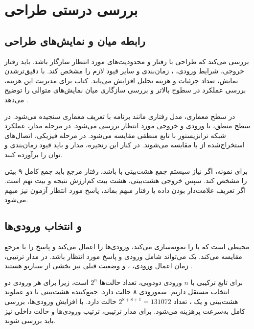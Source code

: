 \section{بررسی درستی طراحی}
\label{sec:book-verification}
\subsection{رابطه میان  و نمایش‌های طراحی}
 بررسی می‌کند که طراحی با رفتار و محدودیت‌های مورد انتظار
سازگار باشد.  باید رفتار خروجی، شرایط ورودی، ،
زمان‌بندی و سایر قیود لازم را مشخص کند. با دقیق‌ترشدن نمایش، تعداد جزئیات و هزینه
تحلیل افزایش می‌یابد. کتاب برای مدیریت این هزینه، بررسی عملکرد در سطوح بالاتر و
بررسی سازگاری میان نمایش‌های متوالی را توضیح می‌دهد
\cite[بخش ، شکل ]{weste}.

در سطح معماری، مدل رفتاری مانند برنامه  با تعریف معماری سنجیده می‌شود.
در سطح منطق،  با ورودی و خروجی مورد انتظار بررسی می‌شود. در مرحله مدار،
عملکرد شبکه ترانزیستور با تابع منطقی مقایسه می‌شود. در مرحله فیزیکی، اتصال‌های
استخراج‌شده از  با  مقایسه می‌شوند. در کنار این زنجیره،
مدار و  باید قیود زمان‌بندی و توان را برآورده کنند.

برای نمونه، اگر نیاز سیستم جمع هشت‌بیتی با  باشد، رفتار مرجع باید
جمع کامل ۹ بیتی را مشخص کند. سپس خروجی هشت‌بیتی، هشت بیت کم‌ارزش نتیجه و
 بیت نهم است. اگر تعریف علامت‌دار بودن داده یا رفتار 
مبهم بماند، پاسخ مورد انتظار آزمون نیز مبهم می‌شود.

\subsection{ و انتخاب ورودی‌ها}
 محیطی است که  یا  را نمونه‌سازی
می‌کند، ورودی‌ها را اعمال می‌کند و پاسخ را با مرجع مقایسه می‌کند. یک 
می‌تواند شامل ورودی و پاسخ مورد انتظار باشد. در مدار ترتیبی، زمان اعمال ورودی،
،  و وضعیت قبلی نیز بخشی از سناریو هستند
\cite[صفحه ۵۳]{weste}.

برای تابع ترکیبی با \(n\) ورودی دودویی، تعداد حالت‌ها \(2^n\) است، زیرا برای هر
ورودی دو انتخاب مستقل داریم.  سه‌ورودی ۸ حالت دارد. جمع‌کننده هشت‌بیتی
با دو عملوند هشت‌بیتی و یک ، تعداد
\(2^{8+8+1}=131072\) حالت دارد. با افزایش ورودی‌ها، بررسی کامل به‌سرعت پرهزینه
می‌شود. برای مدار ترتیبی، ترتیب ورودی‌ها و حالت داخلی نیز باید بررسی شوند.


